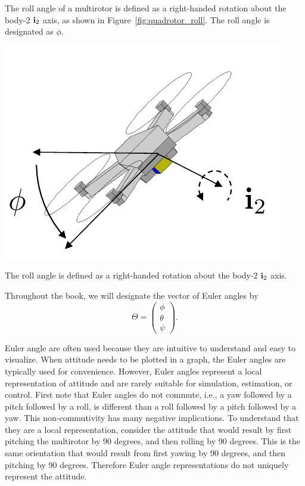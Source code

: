 %
The roll angle of a multirotor is defined as a right-handed rotation about the body-2 $\mathbf{i}_2$ axis, as shown in Figure~\ref{fig:quadrotor_roll}.  The roll angle is designated as $\phi$.
\begin{marginfigure}
  \centering\includegraphics[width=\linewidth]{chap2_preliminaries/figures/quadrotor_roll}
  \caption{The roll angle is defined as a right-handed rotation about the body-2 $\mathbf{i}_2$ axis.}
  \label{fig:quadrotor_roll}  
\end{marginfigure}
Throughout the book, we will designate the vector of Euler angles by 
\[
\Theta = \begin{pmatrix} \phi \\ \theta \\ \psi \end{pmatrix}.
\]

Euler angle are often used because they are intuitive to understand and easy to visualize.  When attitude needs to be plotted in a graph, the Euler angles are typically used for convenience.  However, Euler angles represent a local representation of attitude and are rarely suitable for simulation, estimation, or control.  First note that Euler angles do not commute, i.e., a yaw followed by a pitch followed by a roll, is different than a roll followed by a pitch followed by a yaw.  This non-commutivity has many negative implications.  To understand that they are a local representation, consider the attitude that would result by first pitching the multirotor by 90 degrees, and then rolling by 90 degrees.  This is the same orientation that would result from first yawing by 90 degrees, and then pitching by 90 degrees.  Therefore Euler angle representations do not uniquely represent the attitude.


